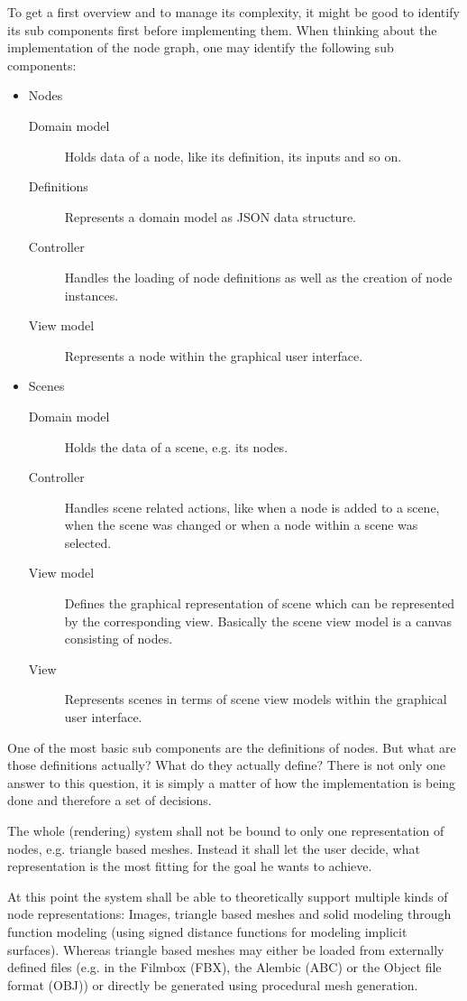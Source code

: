 \documentclass[10pt, openright, notitlepage]{scrreprt}
\begin{document}
To get a first overview and to manage its complexity, it might be good to
identify its sub components first before implementing them.
When thinking about the implementation of the node graph, one may identify the
following sub components:

\begin{itemize}
\item Nodes
\begin{description}
\item[{Domain model}] Holds data of a node, like its definition, its inputs and so
on.
\item[{Definitions }] Represents a domain model as JSON data structure.
\item[{Controller  }] Handles the loading of node definitions as well as the
creation of node instances.
\item[{View model  }] Represents a node within the graphical user interface.
\end{description}
\item Scenes
\begin{description}
\item[{Domain model}] Holds the data of a scene, e.g. its nodes.
\item[{Controller  }] Handles scene related actions, like when a node is added to
a scene, when the scene was changed or when a node within a
scene was selected.
\item[{View model  }] Defines the graphical representation of scene which can be
represented by the corresponding view. Basically the scene
view model is a canvas consisting of nodes.
\item[{View        }] Represents scenes in terms of scene view models within the
graphical user interface.
\end{description}
\end{itemize}

One of the most basic sub components are the definitions of nodes. But what are
those definitions actually? What do they actually define? There is not only one
answer to this question, it is simply a matter of how the implementation is
being done and therefore a set of decisions.

The whole (rendering) system shall not be bound to only one representation of
nodes, e.g. triangle based meshes. Instead it shall let the user decide, what
representation is the most fitting for the goal he wants to achieve.

At this point the system shall be able to theoretically support multiple kinds of
node representations: Images, triangle based meshes and solid modeling through
function modeling (using signed distance functions for modeling implicit
surfaces). Whereas triangle based meshes may either be loaded from externally
defined files (e.g. in the Filmbox (FBX), the Alembic (ABC) or the Object file
format (OBJ)) or directly be generated using procedural mesh generation.
\end{document}
